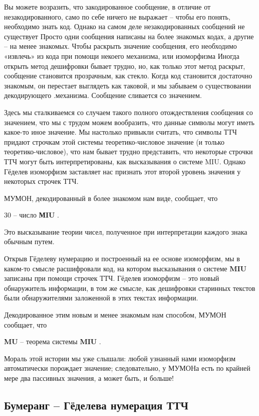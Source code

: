 \documentclass[../main.tex]{subfiles}
\begin{document}
Вы можете возразить, что закодированное сообщение, в отличие от незакодированного, само по себе ничего не выражает \--- чтобы его понять, необходимо знать код. Однако на самом деле незакодированных сообщений не существует Просто одни сообщения написаны на более знакомых кодах, а другие \--- на менее знакомых. Чтобы раскрыть значение сообщения, его необходимо «извлечь» из кода при помощи некоего механизма, или изоморфизма Иногда открыть метод дешифровки бывает трудно, но, как только этот метод раскрыт, сообщение становится прозрачным, как стекло. Когда код становится достаточно знакомым, он перестает выглядеть как таковой, и мы забываем о существовании декодирующего .механизма. Сообщение сливается со значением.

Здесь мы сталкиваемся со случаем такого полного отождествления сообщения со значением, что мы с трудом можем вообразить, что данные символы могут иметь какое-то иное значение. Мы настолько привыкли считать, что символы ТТЧ придают строчкам этой системы теоретико-числовое значение (и только теоретико-числовое), что нам бывает трудно представить, что некоторые строчки ТТЧ могут быть интерпретированы, как высказывания о системе MIU. Однако Гёделев изоморфизм заставляет нас признать этот второй уровень значения у некоторых строчек ТТЧ.

МУМОН, декодированный в более знакомом нам виде, сообщает, что

30 \--- число \textbf{МIU} .

Это высказывание теории чисел, полученное при интерпретации каждого знака обычным путем.

Открыв Гёделеву нумерацию и построенный на ее основе изоморфизм, мы в каком-то смысле расшифровали код, на котором высказывания о системе \textbf{MIU} записаны при помощи строчек ТТЧ. Гёделев изоморфизм \--- это новый обнаружитель информации, в том же смысле, как дешифровки старинных текстов были обнаружителями заложенной в этих текстах информации.

Декодированное этим новым и менее знакомым нам способом, МУМОН сообщает, что

\textbf{MU} \--- теорема системы \textbf{MIU} .

Мораль этой истории мы уже слышали: любой узнанный нами изоморфизм автоматически порождает значение; следовательно, у МУМОНа есть по крайней мере два пассивных значения, а может быть, и больше!


\subsection{Бумеранг \--- Гёделева нумерация ТТЧ}
\end{document}

